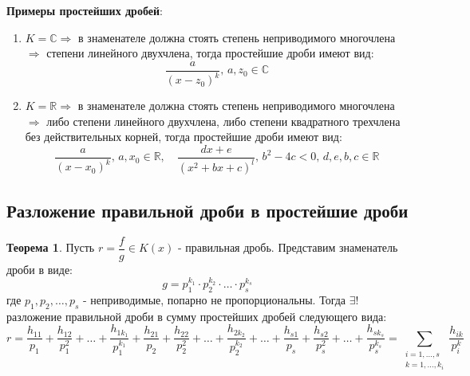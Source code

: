 \documentclass[12pt]{article}
\newcommand{\MR}{\mathbb{R}}
\newcommand{\MC}{\mathbb{C}}
\theoremstyle{definition}
\newtheorem{theorem}{Теорема}
\newcommand{\ddsum}[2]{\displaystyle\sum\limits_{#1}^{#2}}
\begin{document}
\textbf{Примеры простейших дробей}:
\begin{enumerate}[label=\arabic*)]
	\item $K = \MC \Rightarrow$ в знаменателе должна стоять степень неприводимого многочлена $\Rightarrow$ степени линейного двухчлена, тогда простейшие дроби имеют вид:
	$$
		\dfrac{a}{(x - z_0)^k}, \, a,z_0 \in \MC
	$$
	\item $K = \MR \Rightarrow$ в знаменателе должна стоять степень неприводимого многочлена $\Rightarrow$ либо степени линейного двухчлена, либо степени квадратного трехчлена без действительных корней, тогда простейшие дроби имеют вид:
	$$
		\dfrac{a}{(x - x_0)^k}, \, a,x_0 \in \MR, \quad \dfrac{dx + e}{(x^2  + bx + c)^l}, \, b^2 - 4c < 0, \, d,e,b,c \in \MR
	$$
\end{enumerate}
\newpage
\subsection*{Разложение правильной дроби в простейшие дроби}
\begin{theorem}
	Пусть $r = \dfrac{f}{g}\in K(x)$ - правильная дробь. Представим знаменатель дроби в виде:
	$$
		g= p_1^{k_1}{\cdot}p_2^{k_2}{\cdot}\dotsc{\cdot}p_s^{k_s}
	$$
	где $p_1,p_2,\dotsc, p_s$ - неприводимые, попарно не пропорциональны. Тогда $\exists!$ разложение правильной дроби в сумму простейших дробей следующего вида:
	$$
		r = \dfrac{h_{11}}{p_1} + \dfrac{h_{12}}{p_1^2} + \dotsc+ \dfrac{h_{1k_1}}{p_1^{k_1}} + \dfrac{h_{21}}{p_2} + \dfrac{h_{22}}{p_2^2} + \dotsc+ \dfrac{h_{2k_2}}{p_2^{k_2}} + \dotsc  + \dfrac{h_{s1}}{p_s} + \dfrac{h_{s2}}{p_s^2} + \dotsc+ \dfrac{h_{sk_s}}{p_s^{k_s}} = \ddsum{\substack{i = 1,\dotsc,s\\k =1,\dotsc,k_i}}{} \dfrac{h_{ik}}{p_i^k}
	$$
\end{theorem}
\end{document}
